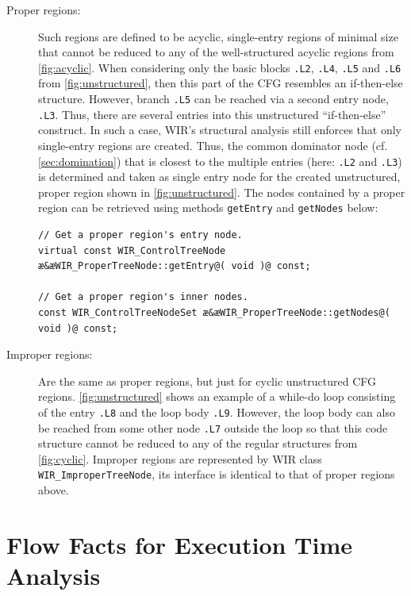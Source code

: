 \begin{description}
  \item[Proper regions:] Such regions are defined to be acyclic, single-entry regions of minimal size that cannot be reduced to any of the well-structured acyclic regions from \cref{fig:acyclic}.
  When considering only the basic blocks \texttt{.L2}, \texttt{.L4}, \texttt{.L5} and \texttt{.L6} from \cref{fig:unstructured}, then this part of the \gls{CFG} resembles an if-then-else structure.
  However, branch \texttt{.L5} can be reached via a second entry node, \texttt{.L3}.
  Thus, there are several entries into this unstructured ``if-then-else'' construct.
  In such a case, \gls{WIR}'s structural analysis still enforces that only single-entry regions are created.
  Thus, the common dominator node (cf. \cref{sec:domination}) that is closest to the multiple entries (here: \texttt{.L2} and \texttt{.L3}) is determined and taken as single entry node for the created unstructured, proper region shown in \cref{fig:unstructured}.
  The nodes contained by a proper region can be retrieved using methods \texttt{getEntry} and \texttt{getNodes} below:
\begin{lstlisting}[style=code,float=!h,xleftmargin=10mm]
// Get a proper region's entry node.
virtual const WIR_ControlTreeNode æ&æWIR_ProperTreeNode::getEntry@( void )@ const;

// Get a proper region's inner nodes.
const WIR_ControlTreeNodeSet æ&æWIR_ProperTreeNode::getNodes@( void )@ const;
\end{lstlisting}

  \item[Improper regions:] Are the same as proper regions, but just for cyclic unstructured  \gls{CFG} regions.
  \cref{fig:unstructured} shows an example of a while-do loop consisting of the entry \texttt{.L8} and the loop body \texttt{.L9}.
  However, the loop body can also be reached from some other node \texttt{.L7} outside the loop so that this code structure cannot be reduced to any of the regular structures from \cref{fig:cyclic}.
  Improper regions are represented by \gls{WIR} class \texttt{WIR\_ImproperTreeNode}, its interface is identical to that of proper regions above.
\end{description}


\section{Flow Facts for Execution Time Analysis}
\label{sec:flowfacts}

